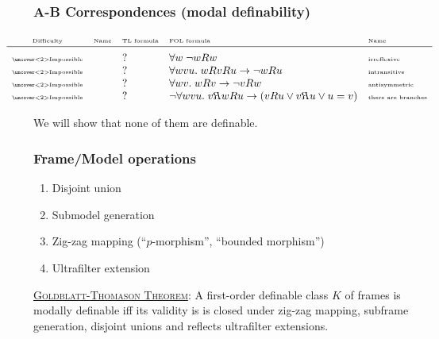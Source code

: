 \documentclass[xcolor=x11names]{beamer}
\newcommand{\bemph}[1] {{\color{DeepSkyBlue3}{#1}}}
\newcommand{\dzsa}[1]{\textsc{\underline{#1}}:}
\newcommand{\lthen}{\rightarrow}
\newcommand{\magyi}[1]{\textup{\bemph{\tiny #1}}}
\begin{document}
\begin{frame}
\frametitle{A-B Correspondences (modal definability)}
\scriptsize
\[\hspace{-.9cm}\begin{array}{cclll}
\rotatebox{0}{\textup{\tiny Difficulty}} & \textup{\tiny Name} & \textup{\tiny TL formula} & \textup{\tiny FOL formula} &\textup{\tiny Name}
\\ \hline
\\[-.7em]  \textup{\tiny \uncover<2>{Impossible}}&  & ? & \forall w \; \lnot wRw &\textup{\tiny irreflexive}
\\  \textup{\tiny \uncover<2>{Impossible}}&  & ? & \forall {wvu}.\; wRvRu\lthen \lnot wRu &\textup{\tiny intransitive}
\\  \textup{\tiny \uncover<2>{Impossible}}&  & ? & \forall {wv} .\;wRv\lthen \lnot vRw &\textup{\tiny antisymmetric}
\\  \textup{\tiny \uncover<2>{Impossible}}&  & ? & \lnot \forall {wvu}.\;v\reflectbox {$R$}wRu\lthen (vRu \lor v\reflectbox {$R$}u\lor u=v) &\textup{\tiny there are branches}
\end{array}\]

\bigskip

\pause

\centering We will show that none of them are definable.


\end{frame}


\begin{frame}
\frametitle{Frame/Model operations}
\begin{enumerate}
	\item Disjoint union
\\ \magyi{Glueing frames together -- that act is modally invisible btw.}
	\item Submodel generation
\\ \magyi{Erasing things from the frame in a modally invisible way}
	\item Zig-zag mapping (``$p$-morphism'', ``bounded morphism'')
\\ \magyi{Super handy modally invisible transformation}
	\item Ultrafilter extension
\\ \magyi{Putting all contingency into the frame -- beautiful advanced stuff, but we won't discuss it.}
\end{enumerate}

\dzsa{Goldblatt-Thomason Theorem}
A first-order definable class $K$ of frames is modally definable iff its validity is
is closed under zig-zag mapping, subframe generation, disjoint
unions and reflects ultrafilter extensions.

\end{frame}
\end{document}
